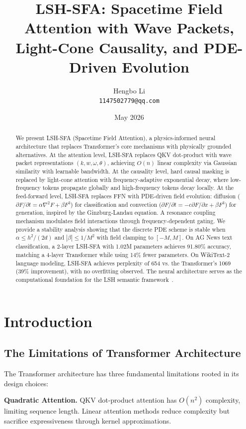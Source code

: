 \documentclass{article}
\title{LSH-SFA: Spacetime Field Attention with Wave Packets, Light-Cone Causality, and PDE-Driven Evolution}
\author{Hengbo Li\\
\texttt{1147502779@qq.com}
}
\date{May 2026}
\begin{document}
\maketitle

\begin{abstract}
We present LSH-SFA (Spacetime Field Attention), a physics-informed neural architecture that replaces Transformer's core mechanisms with physically grounded alternatives. At the attention level, LSH-SFA replaces QKV dot-product with wave packet representations $(k, w, \omega, \theta)$, achieving $O(n)$ linear complexity via Gaussian similarity with learnable bandwidth. At the causality level, hard causal masking is replaced by light-cone attention with frequency-adaptive exponential decay, where low-frequency tokens propagate globally and high-frequency tokens decay locally. At the feed-forward level, LSH-SFA replaces FFN with PDE-driven field evolution: diffusion ($\partial F/\partial t = \alpha \nabla^2 F + \beta F^3$) for classification and convection ($\partial F/\partial t = -c \partial F/\partial x + \beta F^3$) for generation, inspired by the Ginzburg-Landau equation. A resonance coupling mechanism modulates field interactions through frequency-dependent gating. We provide a stability analysis showing that the discrete PDE scheme is stable when $\alpha \leq h^2/(2d)$ and $|\beta| \leq 1/M^2$ with field clamping to $[-M, M]$. On AG News text classification, a 2-layer LSH-SFA with 1.02M parameters achieves 91.80\% accuracy, matching a 4-layer Transformer while using 14\% fewer parameters. On WikiText-2 language modeling, LSH-SFA achieves perplexity of 654 vs. the Transformer's 1069 (39\% improvement), with no overfitting observed. The neural architecture serves as the computational foundation for the LSH semantic framework~\cite{lsh-three-layer}.
\end{abstract}

\section{Introduction}

\subsection{The Limitations of Transformer Architecture}

The Transformer architecture \citep{vaswani2017attention} has three fundamental limitations rooted in its design choices:

\textbf{Quadratic Attention.} QKV dot-product attention has $O(n^2)$ complexity, limiting sequence length. Linear attention methods \citep{katharopoulos2020transformers, choromanski2021rethinking} reduce complexity but sacrifice expressiveness through kernel approximations.
\end{document}
